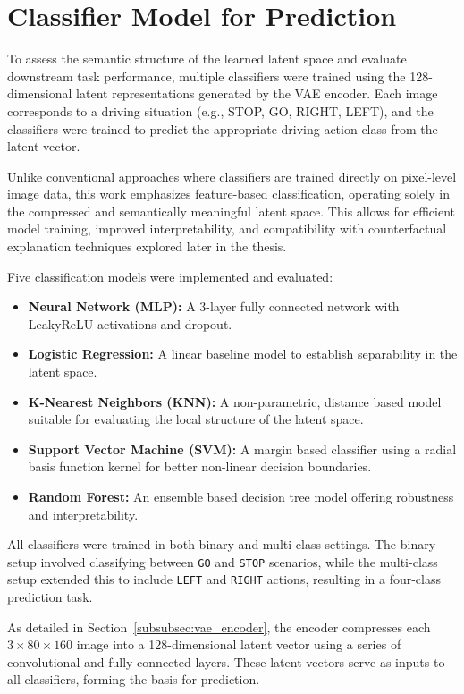 \section{Classifier Model for Prediction} \label{sec:classifier_mdel_for_prediction}
To assess the semantic structure of the learned latent space and evaluate downstream task performance, multiple classifiers were trained using the 128-dimensional latent representations generated by the VAE encoder. Each image corresponds to a driving situation (e.g., STOP, GO, RIGHT, LEFT), and the classifiers were trained to predict the appropriate driving action class from the latent vector.

Unlike conventional approaches where classifiers are trained directly on pixel-level image data, this work emphasizes feature-based classification, operating solely in the compressed and semantically meaningful latent space. This allows for efficient model training, improved interpretability, and compatibility with counterfactual explanation techniques explored later in the thesis.

Five classification models were implemented and evaluated:
\begin{itemize}
    \item \textbf{Neural Network (MLP):} A 3-layer fully connected network with LeakyReLU activations and dropout.
    \item \textbf{Logistic Regression:} A linear baseline model to establish separability in the latent space.
    \item \textbf{K-Nearest Neighbors (KNN):} A non-parametric, distance based model suitable for evaluating the local structure of the latent space.
    \item \textbf{Support Vector Machine (SVM):} A margin based classifier using a radial basis function kernel for better non-linear decision boundaries.
    \item \textbf{Random Forest:} An ensemble based decision tree model offering robustness and interpretability.
\end{itemize}

All classifiers were trained in both binary and multi-class settings. The binary setup involved classifying between \texttt{GO} and \texttt{STOP} scenarios, while the multi-class setup extended this to include \texttt{LEFT} and \texttt{RIGHT} actions, resulting in a four-class prediction task.

As detailed in Section~\ref{subsubsec:vae_encoder}, the encoder compresses each $3 \times 80 \times 160$ image into a 128-dimensional latent vector using a series of convolutional and fully connected layers. These latent vectors serve as inputs to all classifiers, forming the basis for prediction.

